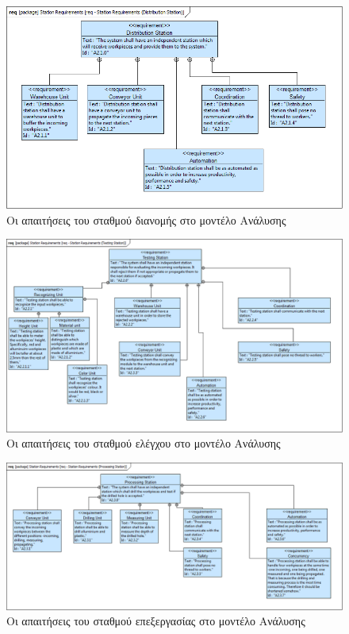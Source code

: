 \documentclass[a4paper,12pt,twoside]{report}
\begin{document}
\begin{appendices}
			\begin{figure}[hp]
					\centering
					\includegraphics[scale=0.30]{AnalysisModel_req-StationRequirements(DistributionStation).png}
					\caption{Οι απαιτήσεις του σταθμού διανομής στο μοντέλο Ανάλυσης}
					\label{φωτ:Οι απαιτήσεις του σταθμού διανομής στο μοντέλο Ανάλυσης}
			\end{figure}
			
			\begin{figure}[hp]
					\centering
					\includegraphics[scale=0.30]{AnalysisModel_req-StationRequirements(TestingStation).png}
					\caption{Οι απαιτήσεις του σταθμού ελέγχου στο μοντέλο Ανάλυσης}
					\label{φωτ:Οι απαιτήσεις του σταθμού ελέγχου στο μοντέλο Ανάλυσης}
			\end{figure}
			
			\begin{figure}[hp]
					\centering
					\includegraphics[scale=0.30]{AnalysisModel_req-StationRequirements(ProcessingStation).png}
					\caption{Οι απαιτήσεις του σταθμού επεξεργασίας στο μοντέλο Ανάλυσης}
					\label{φωτ:Οι απαιτήσεις του σταθμού επεξεργασίας στο μοντέλο Ανάλυσης}
			\end{figure}
			

\end{appendices}
\end{document}
